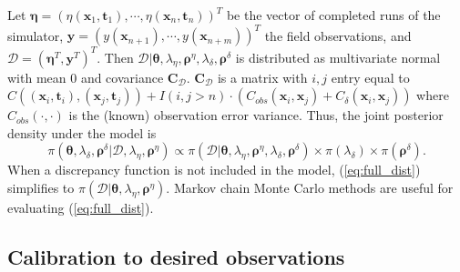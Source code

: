 \documentclass[12pt]{article}
\begin{document}
Let $\boldsymbol \eta = (\eta(\mathbf x_1,\mathbf t_1),\cdots,\eta(\mathbf x_n,\mathbf t_n))^T$ be the vector of completed runs of the simulator, $\mathbf y = (y(\mathbf x_{n+1}),\cdots,y(\mathbf x_{n+m}))^T$ the field observations, 
and $\mathcal D = (\boldsymbol \eta^T,\mathbf y^T)^T$.
%
Then $\mathcal D | \boldsymbol \theta,\lambda_\eta, \boldsymbol \rho^\eta,\lambda_\delta,\boldsymbol \rho^\delta$ is distributed as multivariate normal with mean 0 and covariance $\mathbf C_\mathcal D$. 
%
$\mathbf C_\mathcal D$ is a matrix with $i,j$ entry equal to 
$
C((\mathbf x_i,\mathbf t_i),(\mathbf x_j,\mathbf t_j)) + I(i,j>n)\cdot(C_{obs}(\mathbf x_i,\mathbf x_j) + C_\delta(\mathbf x_i,\mathbf x_j))
$
where $C_{obs}(\cdot,\cdot)$ is the (known) observation error variance.
%
Thus, the joint posterior density under the model is
%
\begin{equation} \label{eq:full_dist}
\pi(\boldsymbol \theta,\lambda_\delta,\boldsymbol \rho^\delta|\mathcal D,\lambda_\eta,\boldsymbol \rho^\eta)
\propto \pi(\mathcal D | \boldsymbol \theta,\lambda_\eta, \boldsymbol \rho^\eta,\lambda_\delta,\boldsymbol \rho^\delta) \times %
\pi(\lambda_\delta) \times \pi(\boldsymbol \rho^\delta).
\end{equation}
%
When a discrepancy function is not included in the model, 
(\ref{eq:full_dist}) simplifies to 
%
$\pi(\mathcal D | \boldsymbol \theta,\lambda_\eta, \boldsymbol \rho^\eta)$. 
%
Markov chain Monte Carlo methods are useful for evaluating (\ref{eq:full_dist}).

\subsection{Calibration to desired observations}
\end{document}
